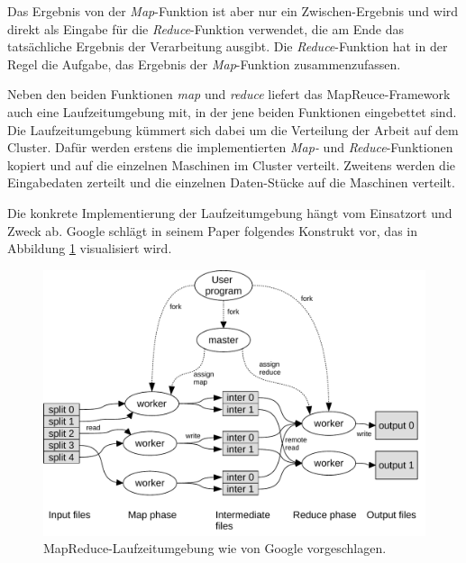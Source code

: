 Das Ergebnis von der \textit{Map}-Funktion ist aber nur ein Zwischen-Ergebnis und wird direkt als Eingabe für die \textit{Reduce}-Funktion verwendet,
die am Ende das tatsächliche Ergebnis der Verarbeitung ausgibt. Die \textit{Reduce}-Funktion hat in der Regel die Aufgabe, das Ergebnis der \textit{Map}-Funktion
zusammenzufassen.  


Neben den beiden Funktionen \textit{map} und \textit{reduce} liefert das MapReuce-Framework auch eine Laufzeitumgebung mit, in der jene beiden Funktionen eingebettet sind.
Die Laufzeitumgebung kümmert sich dabei um die Verteilung der Arbeit auf dem Cluster. 
Dafür werden erstens die implementierten \textit{Map-} und \textit{Reduce}-Funktionen
kopiert und auf die einzelnen Maschinen im Cluster verteilt. Zweitens werden die Eingabedaten zerteilt und die einzelnen Daten-Stücke auf die Maschinen verteilt. 

Die konkrete Implementierung der Laufzeitumgebung hängt vom Einsatzort und Zweck ab. 
Google schlägt in seinem Paper folgendes Konstrukt vor, das in Abbildung \ref{fig:mapreduce} visualisiert wird.

\begin{figure}[H]
\centering
\includegraphics[width=1.0\textwidth]{images/06mapreduce.pdf}
\caption{MapReduce-Laufzeitumgebung wie von Google vorgeschlagen. \cite{miner2012mapreduce}}
\label{fig:mapreduce}
\end{figure}

